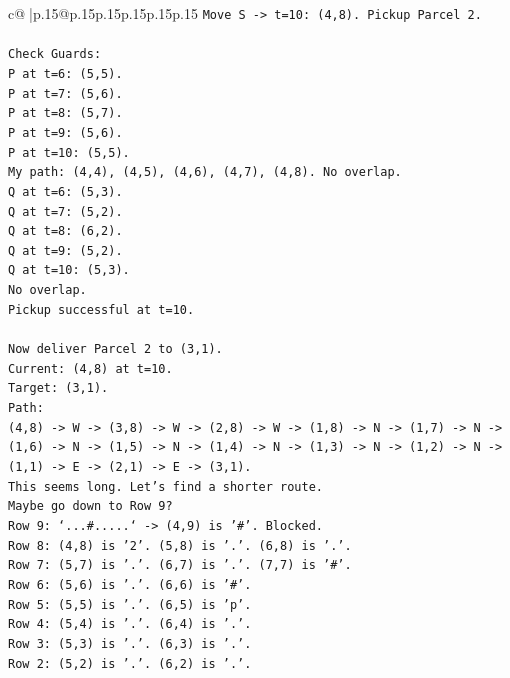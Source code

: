 \documentclass{article}
\begin{document}
{\begin{supertabular}{c@{$\;$}|p{.15\linewidth}@{}p{.15\linewidth}p{.15\linewidth}p{.15\linewidth}p{.15\linewidth}p{.15\linewidth}}
{{{\texttt{Move S {-}> t=10: (4,8). Pickup Parcel 2.} \\
\\ 
\texttt{Check Guards:} \\
\texttt{P at t=6: (5,5).} \\
\texttt{P at t=7: (5,6).} \\
\texttt{P at t=8: (5,7).} \\
\texttt{P at t=9: (5,6).} \\
\texttt{P at t=10: (5,5).} \\
\texttt{My path: (4,4), (4,5), (4,6), (4,7), (4,8). No overlap.} \\
\texttt{Q at t=6: (5,3).} \\
\texttt{Q at t=7: (5,2).} \\
\texttt{Q at t=8: (6,2).} \\
\texttt{Q at t=9: (5,2).} \\
\texttt{Q at t=10: (5,3).} \\
\texttt{No overlap.} \\
\texttt{Pickup successful at t=10.} \\
\\ 
\texttt{Now deliver Parcel 2 to (3,1).} \\
\texttt{Current: (4,8) at t=10.} \\
\texttt{Target: (3,1).} \\
\texttt{Path:} \\
\texttt{(4,8) {-}> W {-}> (3,8) {-}> W {-}> (2,8) {-}> W {-}> (1,8) {-}> N {-}> (1,7) {-}> N {-}> (1,6) {-}> N {-}> (1,5) {-}> N {-}> (1,4) {-}> N {-}> (1,3) {-}> N {-}> (1,2) {-}> N {-}> (1,1) {-}> E {-}> (2,1) {-}> E {-}> (3,1).} \\
\texttt{This seems long. Let's find a shorter route.} \\
\texttt{Maybe go down to Row 9?} \\
\texttt{Row 9: `...\#.....` {-}> (4,9) is '\#'. Blocked.} \\
\texttt{Row 8: (4,8) is '2'. (5,8) is '.'. (6,8) is '.'.} \\
\texttt{Row 7: (5,7) is '.'. (6,7) is '.'. (7,7) is '\#'.} \\
\texttt{Row 6: (5,6) is '.'. (6,6) is '\#'.} \\
\texttt{Row 5: (5,5) is '.'. (6,5) is 'p'.} \\
\texttt{Row 4: (5,4) is '.'. (6,4) is '.'.} \\
\texttt{Row 3: (5,3) is '.'. (6,3) is '.'.} \\
\texttt{Row 2: (5,2) is '.'. (6,2) is '.'.} \\
}}}
\end{supertabular}}
\end{document}
